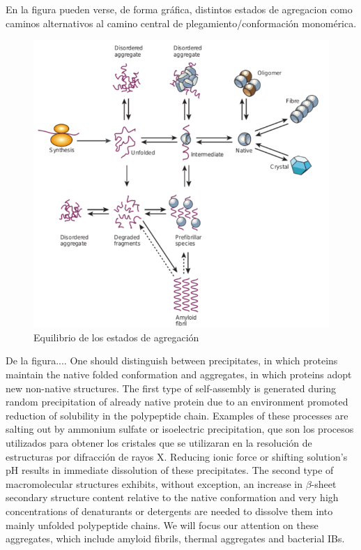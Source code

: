 En la figura pueden verse, de forma gráfica, distintos estados de agregacion como caminos alternativos al camino central de plegamiento/conformación monomérica.

\begin{figure}[h!,centered]
\includegraphics[width=\textwidth]{img/aggregationDiagram.png} 
\caption{Equilibrio de los estados de agregación} \label{aggregationDiagram}
\end{figure}


De la figura....
One should distinguish between precipitates, in which proteins maintain the native folded conformation and aggregates, in which proteins adopt new non-native structures. 
The first type of self-assembly is generated during random precipitation of already native protein due to an environment promoted reduction of solubility in the polypeptide chain. 
Examples of these processes are salting out by ammonium sulfate or isoelectric precipitation, que son los procesos utilizados para obtener los cristales que se utilizaran en la resolución de estructuras por difracción de rayos X. 
Reducing ionic force or shifting solution's pH results in immediate dissolution of these precipitates. 
The second type of macromolecular structures exhibits, without exception, an increase in $\beta$-sheet secondary structure content relative to the native conformation and
very high concentrations of denaturants or detergents are needed to dissolve them into mainly unfolded polypeptide chains. 
We will focus our attention on these aggregates, which include amyloid fibrils, thermal aggregates and bacterial IBs. 
















